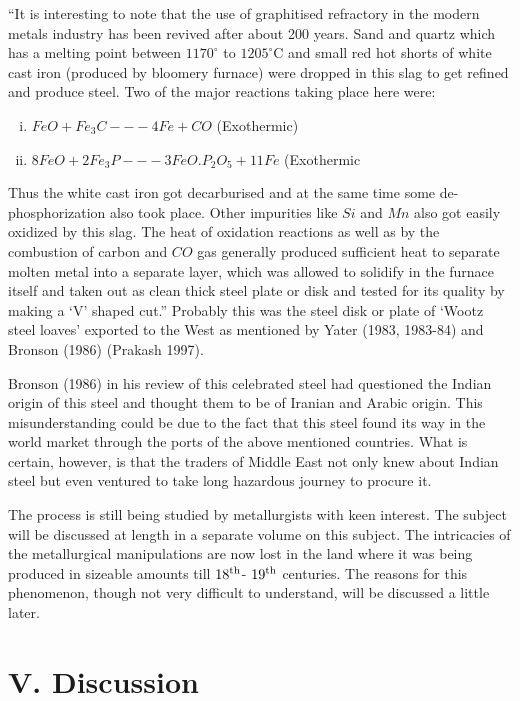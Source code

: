 “It is interesting to note that the use of graphitised refractory in the modern metals industry has been revived after about 200 years. Sand and quartz which has a melting point between $1170^\circ$ to $1205^\circ$C and small red hot shorts of white cast iron (produced by bloomery furnace) were dropped in this slag to get refined and produce steel. Two of the major reactions taking place here were:
\begin{enumerate}[(i)]
\item $FeO + Fe_3C---4Fe + CO$ (Exothermic)                                     
\item $8FeO + 2Fe_3P--- 3FeO.P_2O_5 + 11Fe$ (Exothermic
\end{enumerate}

Thus the white cast iron got decarburised and at the same time some de-phosphorization also took place. Other impurities like $Si$ and $Mn$ also got easily oxidized by this slag. The heat of oxidation reactions as well as by the combustion of carbon and $CO$ gas generally produced sufficient heat to separate molten metal into a separate layer, which was allowed to solidify in the furnace itself and taken out as clean thick steel plate or disk and tested for its quality by making a ‘V’ shaped cut.”  Probably this was the steel disk or plate of ‘Wootz steel loaves’ exported to the West as mentioned by Yater (1983, 1983-84) and Bronson (1986) (Prakash 1997).

Bronson (1986) in his review of this celebrated steel had questioned the Indian origin of this steel and thought them to be of Iranian and Arabic origin. This misunderstanding could be due to the fact that this steel found its way in the world market through the ports of the above mentioned countries. What is certain, however, is that the traders of Middle East not only knew about Indian steel but even ventured to take long hazardous journey to procure it.

The process is still being studied by metallurgists with keen interest. The subject will be discussed at length in a separate volume on this subject. The intricacies of the metallurgical manipulations are now lost in the land where it was being produced in sizeable amounts till $18^{\rm th}$- $19^{\rm th}$ centuries. The reasons for this phenomenon, though not very difficult to understand, will be discussed a little later. 

\vspace{-.3cm}

\section*{V. Discussion }\label{section-5}

